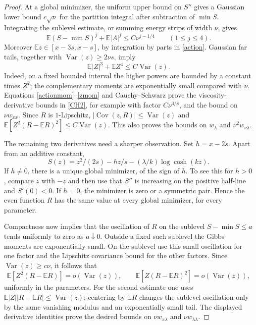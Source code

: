 \documentclass[11pt]{article}
\begin{document}
\begin{proof}
At a global minimizer, the uniform upper bound on $S''$ gives a Gaussian lower bound $c\sqrt\nu$ for the partition integral after subtraction of $\min S$. Integrating the sublevel estimate, or summing energy strips of width $\nu$, gives
\begin{equation}\label{actionmom}
\mathbb E(S-\min S)^j+\mathbb E|A|^j\le C\nu^{j-1/4}\qquad(1\le j\le4).
\end{equation}
Moreover $\mathbb E z\in[x-3s,x-s]$, by integration by parts in \eqref{action}. Gaussian far tails, together with $\operatorname{Var}(z)\ge2\nu s$, imply
\begin{equation}\label{zmom}
 \mathbb E|Z|^3+\mathbb E Z^4\le C\operatorname{Var}(z).
\end{equation}
Indeed, on a fixed bounded interval the higher powers are bounded by a constant times $Z^2$; the complementary moments are exponentially small compared with $\nu$. Equations \eqref{actionmom}--\eqref{zmom} and Cauchy--Schwarz prove the viscosity-derivative bounds in \eqref{CH2}, for example with factor $C\nu^{3/8}$, and the bound on $\nu w_{xx}$. Since $R$ is $1$-Lipschitz, $|\operatorname{Cov}(z,R)|\le\operatorname{Var}(z)$ and $\mathbb E[Z^2(R-\mathbb E R)^2]\le C\operatorname{Var}(z)$. This also proves the bounds on $w_\lambda$ and $\nu^2w_{\nu\lambda}$.

The remaining two derivatives need a sharper observation. Set $h=x-2s$. Apart from an additive constant,
\[
 S(z)=z^2/(2s)-hz/s-(\lambda/k)\log\cosh(kz).
\]
If $h\ne0$, there is a unique global minimizer, of the sign of $h$. To see this for $h>0$, compare $z$ with $-z$ and then use that $S''$ is increasing on the positive half-line and $S'(0)<0$. If $h=0$, the minimizer is zero or a symmetric pair. Hence the even function $R$ has the same value at every global minimizer, for every parameter.

Compactness now implies that the oscillation of $R$ on the sublevel $S-\min S\le a$ tends uniformly to zero as $a\downarrow0$. Outside a fixed such sublevel the Gibbs moments are exponentially small. On the sublevel use this small oscillation for one factor and the Lipschitz covariance bound for the other factors. Since $\operatorname{Var}(z)\ge c\nu$, it follows that
\[
 \mathbb E[Z^2(R-\mathbb E R)]=o(\operatorname{Var}(z)),\qquad
 \mathbb E[Z(R-\mathbb E R)^2]=o(\operatorname{Var}(z)),
\]
uniformly in the parameters. For the second estimate one uses
$\mathbb E|Z||R-\mathbb E R|\le\operatorname{Var}(z)$; centering by $\mathbb E R$ changes the sublevel oscillation only by the same vanishing modulus and an exponentially small tail. The displayed derivative identities prove the desired bounds on $\nu w_{x\lambda}$ and $\nu w_{\lambda\lambda}$.


\end{proof}
\end{document}
